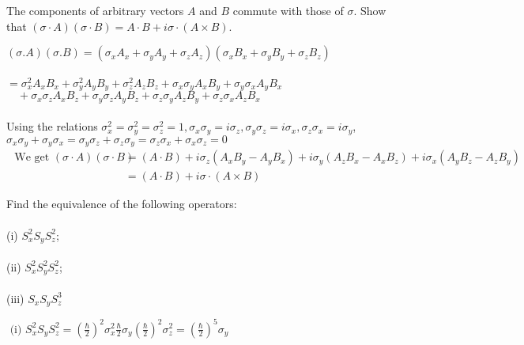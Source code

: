 \begin{enumerate}
	\begin{minipage}{\textwidth}
	\item The components of arbitrary vectors $A$ and $B$ commute with those of $\sigma$.
	Show that $(\sigma \cdot A)(\sigma \cdot B)=A \cdot B+i \sigma \cdot(A \times B)$.
\end{minipage}
\begin{answer}
	$(\sigma . A)(\sigma . B)=\left(\sigma_{x} A_{x}+\sigma_{y} A_{y}+\sigma_{z} A_{z}\right)\left(\sigma_{x} B_{x}+\sigma_{y} B_{y}+\sigma_{z} B_{z}\right)$\\\\ $=\sigma_{x}^{2} A_{x} B_{x}+\sigma_{y}^{2} A_{y} B_{y}+\sigma_{z}^{2} A_{z} B_{z}+\sigma_{x} \sigma_{y} A_{x} B_{y}+\sigma_{y} \sigma_{x} A_{y} B_{x}$\\ $\quad+\sigma_{x} \sigma_{z} A_{x} B_{z}+\sigma_{y} \sigma_{z} A_{y} B_{z}+\sigma_{z} \sigma_{y} A_{z} B_{y}+\sigma_{z} \sigma_{x} A_{z} B_{x}$\\\\
	Using the relations $\sigma_{x}^{2}=\sigma_{y}^{2}=\sigma_{z}^{2}=1, \sigma_{x} \sigma_{y}=i \sigma_{z}, \sigma_{y} \sigma_{z}=i \sigma_{x}, \sigma_{z} \sigma_{x}=i \sigma_{y}$,\\
	$\sigma_{x} \sigma_{y}+\sigma_{y} \sigma_{x}=\sigma_{y} \sigma_{z}+\sigma_{z} \sigma_{y}=\sigma_{z} \sigma_{x}+\sigma_{x} \sigma_{z}=0$\\
	$$\begin{aligned}
	\text { We get }(\sigma \cdot A)(\sigma \cdot B) &=(A \cdot B)+i \sigma_{z}\left(A_{x} B_{y}-A_{y} B_{x}\right)+i \sigma_{y}\left(A_{z} B_{x}-A_{x} B_{z}\right)+i \sigma_{x}\left(A_{y} B_{z}-A_{z} B_{y}\right) \\
	&=(A \cdot B)+i \sigma \cdot(A \times B)
	\end{aligned}$$
\end{answer}
	\begin{minipage}{\textwidth}
	\item Find the equivalence of the following operators:\\\\
	(i) $S_{x}^{2} S_{y} S_{z}^{2}$;\\\\
	(ii) $S_{x}^{2} S_{y}^{2} S_{z}^{2}$;\\\\
	(iii) $S_{x} S_{y} S_{z}^{3}$
\end{minipage}
\begin{answer}
	$\text { (i) } S_{x}^{2} S_{y} S_{z}^{2}=\left(\frac{\hbar}{2}\right)^{2} \sigma_{x}^{2} \frac{\hbar}{2} \sigma_{y}\left(\frac{\hbar}{2}\right)^{2} \sigma_{z}^{2}=\left(\frac{\hbar}{2}\right)^{5} \sigma_{y}$\\\\

\end{answer}
\end{enumerate}
